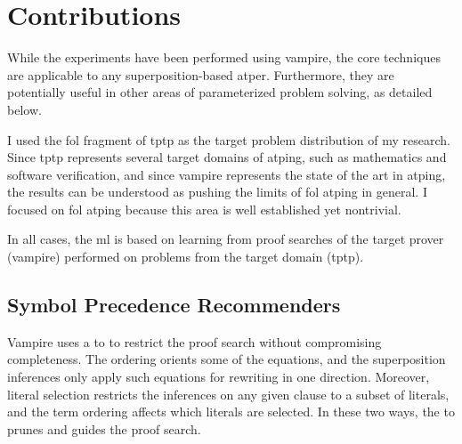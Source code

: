 
\section{Contributions}

While the experiments have been performed using \gls{vampire},
the core techniques are applicable to any \gls{superposition}-based \gls{atper}.
Furthermore, they are potentially useful in other areas of parameterized problem solving, as detailed below.

I used the \gls{fol} fragment of \gls{tptp} as the target problem distribution of my research.
Since \gls{tptp} represents several target domains of \gls{atping},
such as mathematics and software verification,
and since \gls{vampire} represents the state of the art in \gls{atping},
the results can be understood as pushing the limits of \gls{fol} \gls{atping} in general.
I focused on \gls{fol} \gls{atping} because this area is well established yet nontrivial.

In all cases, the \gls{ml} is based on learning from proof searches of the target prover (\gls{vampire}) performed on problems from the target domain (\gls{tptp}).

\subsection{Symbol Precedence Recommenders}
\label{sec:contrib:SymbolPrecedenceRecommenders}

Vampire uses a \gls{to} to restrict the proof search without compromising completeness.
The ordering orients some of the equations, and the superposition inferences only apply such equations for rewriting in one direction.
Moreover, literal selection restricts the inferences on any given clause to a subset of literals, and the term ordering affects which literals are selected.
In these two ways, the \gls{to} prunes and guides the proof search.

